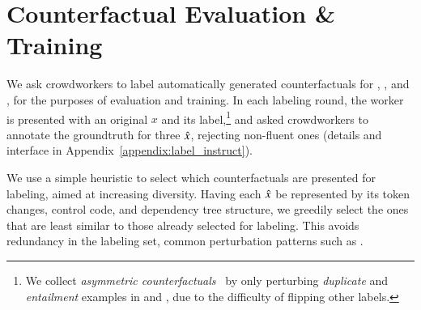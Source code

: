 \section{Counterfactual Evaluation \& Training}
\label{sec:app_label}

We ask crowdworkers to label automatically generated counterfactuals for \sst, \nli, and \qqp, for the purposes of evaluation and training. In each labeling round, the worker is presented with an original $x$ and its label,\footnote{We collect \emph{asymmetric counterfactuals}~\cite{garg2019counterfactual} by only perturbing \emph{duplicate} and \emph{entailment} examples in \qqp and \nli, due to the difficulty of flipping other labels.} and asked crowdworkers to annotate the groundtruth for three $\hat{x}$, rejecting non-fluent ones (details and interface in Appendix~\ref{appendix:label_instruct}).

We use a simple heuristic to select which counterfactuals are presented for labeling, aimed at increasing diversity. 
Having each $\hat{x}$ be represented by its token changes, control code, and dependency tree structure, we greedily select the ones that are least similar to those already selected for labeling. 
This avoids redundancy in the labeling set, \eg common perturbation patterns such as .


